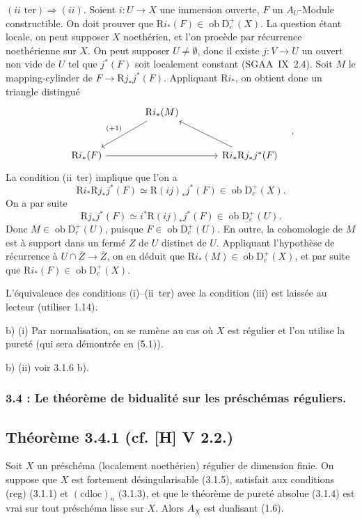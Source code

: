 \documentclass[11pt]{article}
\newcommand{\R}{\mathrm{R}}\newcommand{\RHomCore}{\mathrm{RHom}}
\newcommand{\D}{\mathrm{D}}
\newcommand{\ob}{\operatorname{ob}}
\newcommand{\ol}[1]{\overline{#1}}
\providecommand{\ob}{\operatorname{ob}}
\providecommand{\R}{\mathrm R}
\begin{document}
$(ii\text{~ter}) \Rightarrow (ii)$. Soient $i : U \to X$ une immersion ouverte, $F$ un $A_U$-Module constructible. On doit prouver que $\R i_{*}(F) \in \ob \D_c^{+}(X)$. La question étant locale, on peut supposer $X$ noethérien, et l'on procède par récurrence noethérienne sur $X$. On peut supposer $U \neq \emptyset$, donc il existe 
$j : V \to U$ un
ouvert non vide de $U$ tel que $j^{*}(F)$ soit localement constant (SGAA~IX~2.4). Soit $M$ le mapping-cylinder de $F \to \R j_{*}j^{*}(F)$. Appliquant $\R i_{*}$, on obtient donc un triangle distingué
\[
\begin{tikzcd}[column sep=large,row sep=large]
& \R i_{*}(M) \arrow[dl,"{(+1)}"'] & \\
\R i_{*}(F) \arrow[rr] & & \R i_{*}\R j_{*}j^{*}(F) \arrow[ul]
\end{tikzcd}\quad .
\]
La condition (ii~ter) implique que l'on a
\[
\R i_{*} \R j_{*} j^{*}(F) \simeq \R(ij)_{*} j^{*}(F) \in \ob \D_c^{+}(X).
\]
On a par suite
\[
\R j_{*}j^{*}(F) \simeq i^{*} \R(ij)_{*} j^{*}(F) \in \ob \D_c^{+}(U).
\]
Donc $M \in \ob \D_c^{+}(U)$, puisque $F \in \ob \D_c^{+}(U)$. En outre, la cohomologie de $M$ est à support dans un fermé $Z$ de $U$ distinct de $U$. Appliquant l'hypothèse de récurrence à $U \cap \ol{Z} \to \ol{Z}$, on en déduit que $\R i_{*}(M) \in \ob \D_c^{+}(X)$, et par suite que $\R i_{*}(F) \in \ob \D_c^{+}(X)$.

L'équivalence des conditions (i)--(ii~ter) avec la condition (iii) est laissée au lecteur (utiliser 1.14).

b) (i) Par normalisation, on se ramène au cas où $X$ est régulier et l'on utilise la pureté (qui sera démontrée en (5.1)).

b) (ii) voir 3.1.6 b).

\subsubsection*{3.4 : Le théorème de bidualité sur les préschémas réguliers.}

\subsection*{Théorème 3.4.1 (cf. [H] V 2.2.)}
Soit $X$ un préschéma (localement noethérien) régulier de dimension finie. On suppose que $X$ est fortement désingularisable (3.1.5), satisfait aux conditions (reg) (3.1.1) et $(\mathrm{cdloc})_n$ (3.1.3), et que le théorème de pureté absolue (3.1.4) est vrai sur tout préschéma lisse sur $X$. Alors $A_X$ est dualisant (1.6).
\end{document}
